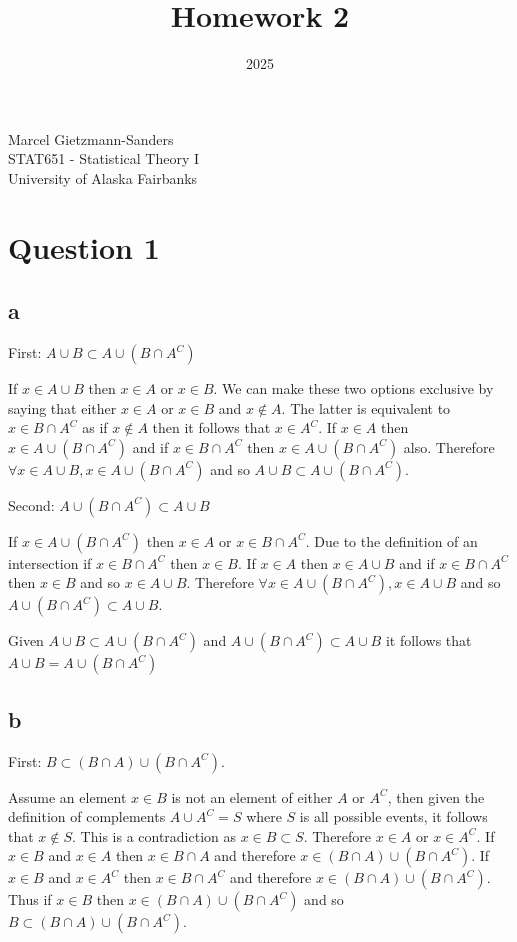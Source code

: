\documentclass[11pt]{article}
\title{Homework 2}
\date{2025}
\makeatletter
\renewcommand{\maketitle}{
\begin{center}

\pagestyle{empty}

{\Large \bf \@title\par}
\vspace{1cm}

{\LARGE Marcel Gietzmann-Sanders}\\[1cm]

STAT651 - Statistical Theory I \\
University of Alaska Fairbanks


\end{center}
}\makeatother
\makeatother
\begin{document}
\maketitle

\section{Question 1}

\subsection{a}

First: $A \cup B \subset A \cup (B \cap A^C)$

If $x \in A \cup B$ then $x \in A$ or $x \in B$. We can make these two options exclusive by saying that either $x\in A$ or $x \in B$ and $x\notin A$. The latter is equivalent to $x \in B \cap A^C$ as if $x \notin A$ then it follows that $x \in A^C$. If $x\in A$ then $x \in A \cup (B \cap A^C)$ and if $x \in B \cap A^C$ then $x \in A \cup (B \cap A^C)$ also. Therefore $\forall x \in A \cup B, x \in A \cup (B \cap A^C)$ and so $A \cup B \subset A \cup (B \cap A^C)$. \newline

Second: $A \cup (B \cap A^C) \subset A \cup B$

If $x \in A \cup (B \cap A^C)$ then $x\in A$ or $x \in B \cap A^C$. Due to the definition of an intersection if $x \in B \cap A^C$ then $x \in B$. If $x \in A$ then $x \in A \cup B$ and if $x \in B \cap A^C$ then $x\in B$ and so $x \in A \cup B$. Therefore $\forall x \in A \cup (B \cap A^C) , x \in A \cup B$ and so $A \cup (B \cap A^C) \subset A \cup B$. \newline

Given $A \cup B \subset A \cup (B \cap A^C)$ and $A \cup (B \cap A^C) \subset A \cup B$ it follows that $A \cup B = A \cup (B \cap A^C)$

\subsection{b}

First: $B \subset (B \cap A) \cup (B \cap A^C)$.

Assume an element $x\in B$ is not an element of either $A$ or $A^C$, then given the definition of complements $A \cup A^C=S$ where $S$ is all possible events, it follows that $x\notin S$. This is a contradiction as $x\in B \subset S$. Therefore $x\in A$ or $x\in A^C$. If $x\in B$ and $x\in A$ then $x \in B \cap A$ and therefore $x \in  (B \cap A) \cup (B \cap A^C)$. If $x\in B$ and $x\in A^C$ then $x \in B \cap A^C$ and therefore $x \in  (B \cap A) \cup (B \cap A^C)$. Thus if $x \in B$ then $x \in (B \cap A) \cup (B \cap A^C)$ and so $B \subset (B \cap A) \cup (B \cap A^C)$. \newline
\end{document}

